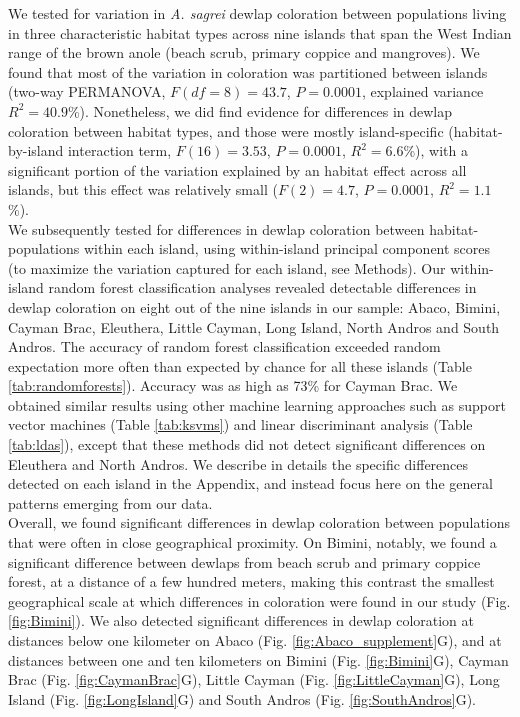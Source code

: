 
We tested for variation in \textit{A. sagrei} dewlap coloration between populations living in three characteristic habitat types across nine islands that span the West Indian range of the brown anole (beach scrub, primary coppice and mangroves). We found that most of the variation in coloration was partitioned between islands (two-way PERMANOVA, $F(df = 8) = 43.7$, $P = 0.0001$, explained variance $R^2 = 40.9$\%). Nonetheless, we did find evidence for differences in dewlap coloration between habitat types, and those were mostly island-specific (habitat-by-island interaction term, $F(16) = 3.53$, $P = 0.0001$, $R^2 = 6.6$\%), with a significant portion of the variation explained by an habitat effect across all islands, but this effect was relatively small ($F(2) = 4.7$, $P = 0.0001$, $R^2 = 1.1$\%).\\

We subsequently tested for differences in dewlap coloration between habitat-populations within each island, using within-island principal component scores (to maximize the variation captured for each island, see Methods). Our within-island random forest classification analyses revealed detectable differences in dewlap coloration on eight out of the nine islands in our sample: Abaco, Bimini, Cayman Brac, Eleuthera, Little Cayman, Long Island, North Andros and South Andros. The accuracy of random forest classification exceeded random expectation more often than expected by chance for all these islands (Table \ref{tab:randomforests}). Accuracy was as high as 73\% for Cayman Brac. We obtained similar results using other machine learning approaches such as support vector machines (Table \ref{tab:ksvms}) and linear discriminant analysis (Table \ref{tab:ldas}), except that these methods did not detect significant differences on Eleuthera and North Andros. We describe in details the specific differences detected on each island in the Appendix, and instead focus here on the general patterns emerging from our data.\\

Overall, we found significant differences in dewlap coloration between populations that were often in close geographical proximity. On Bimini, notably, we found a significant difference between dewlaps from beach scrub and primary coppice forest, at a distance of a few hundred meters, making this contrast the smallest geographical scale at which differences in coloration were found in our study (Fig. \ref{fig:Bimini}). We also detected significant differences in dewlap coloration at distances below one kilometer on Abaco (Fig. \ref{fig:Abaco_supplement}G), and at distances between one and ten kilometers on Bimini (Fig. \ref{fig:Bimini}G), Cayman Brac (Fig. \ref{fig:CaymanBrac}G), Little Cayman (Fig. \ref{fig:LittleCayman}G), Long Island (Fig. \ref{fig:LongIsland}G) and South Andros (Fig. \ref{fig:SouthAndros}G).\\

